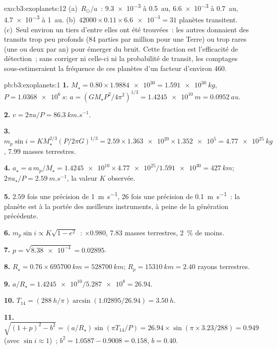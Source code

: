 \begin{solution}{exo:b3:exoplanets:12}
(a)~$R_\odot/a$~: \num{9.3e-3} à \qty{0.5}{au}, \num{6.6e-3} à
\qty{0.7}{au}, \num{4.7e-3} à \qty{1}{au}. (b)~$42000\times0.11\times
\num{6.6e-3} = 31$ planètes transitent. (c)~Seul environ un tiers d'entre elles
ont été trouvées~: les autres donnaient des transits trop peu profonds (84 parties
par million pour une Terre) ou trop rares (une ou deux par an) pour émerger du
bruit. Cette fraction est l'efficacité de détection~; sans corriger ni celle-ci
ni la probabilité de transit, les comptages sous-estimeraient la fréquence de ces
planètes d'un facteur d'environ 460.
\end{solution}

\begin{solution}{pb:b3:exoplanets:1}
\textbf{1.} $M_\star = 0.80\times\num{1.9884e30} = \qty{1.591e30}{kg}$, $P =
\qty{1.0368e6}{s}$: $a = (GM_\star P^2/4\pi^2)^{1/3} = \qty{1.4245e10}{m}
= \qty{0.0952}{au}$.

\textbf{2.} $v = 2\pi a/P = \qty{86.3}{km.s^{-1}}$.

\textbf{3.} $m_p\sin i = KM_\star^{2/3}(P/2\pi G)^{1/3} = 2.59\times\num{1.363e20}
\times\num{1.352e5} = \qty{4.77e25}{kg}$, \num{7.99} masses terrestres.

\textbf{4.} $a_\star = a\,m_p/M_\star = \num{1.4245e10}\times\num{4.77e25}/
\num{1.591e30} = \qty{427}{km}$; $2\pi a_\star/P = \qty{2.59}{m.s^{-1}}$,
la valeur $K$ observée.

\textbf{5.} $2.59$ fois une précision de \qty{1}{m.s^{-1}}, 26 fois une précision de
\qty{0.1}{m.s^{-1}}~: la planète est à la portée des meilleurs instruments,
à peine de la génération précédente.

\textbf{6.} $m_p\sin i \propto K\sqrt{1 - e^2}$~: $\times0.980$, 7.83 masses
terrestres, \qty{2}{\percent} de moins.

\textbf{7.} $p = \sqrt{\num{8.38e-4}} = 0.02895$.

\textbf{8.} $R_\star = 0.76\times\qty{695700}{km} = \qty{528700}{km}$; $R_p =
\qty{15310}{km} = 2.40$ rayons terrestres.

\textbf{9.} $a/R_\star = \num{1.4245e10}/\num{5.287e8} = 26.94$.

\textbf{10.} $T_{14} = (\qty{288}{h}/\pi)\arcsin(1.02895/26.94) = \qty{3.50}{h}$.

\textbf{11.} $\sqrt{(1 + p)^2 - b^2} = (a/R_\star)\sin(\pi T_{14}/P) = 26.94\times
\sin(\pi\times3.23/288) = 0.949$ (avec $\sin i \approx 1$)~; $b^2 =
1.0587 - 0.9008 = 0.158$, $b = 0.40$.


\end{solution}
